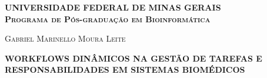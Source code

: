 \documentclass[12pt]{article}
\begin{document}
    \begin{titlepage}

        \center \textsc{\fontsize{14}{12}\selectfont \textbf{UNIVERSIDADE FEDERAL DE MINAS GERAIS}} \\
        \center \textsc{\fontsize{14}{12}\selectfont \textbf{Programa de Pós-graduação
em Bioinformática}}

        \vspace*{4cm}

        \newcommand{\HRule}{\rule{\linewidth}{0.5mm}}
        \textsc{\fontsize{14}{12}\selectfont 
        Gabriel Marinello Moura Leite}\\[0.2cm] 

        \vspace*{2cm}

        \textsc{\fontsize{16}{12}\selectfont \textbf{
        WORKFLOWS DINÂMICOS NA GESTÃO DE TAREFAS E\\RESPONSABILIDADES EM SISTEMAS BIOMÉDICOS}}\\[0.2cm] 

        \vspace*{\fill}
        
        
    \end{titlepage}
    \newpage
\end{document}
